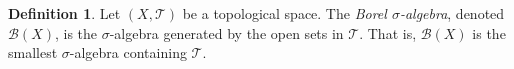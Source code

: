 \documentclass[a4paper,11pt]{article}
\theoremstyle{plain}
\newtheorem{lemma}[theorem]{Lemma}
\theoremstyle{definition}
\newtheorem{definition}[theorem]{Definition}
\begin{document}




\begin{definition}\citep[p.~5]{SC}
Let $(X,\mathcal{T})$ be a topological space. The \textit{Borel $\sigma$-algebra}, denoted $\mathcal{B}(X)$, is the $\sigma$-algebra generated by the open sets in $\mathcal{T}$. That is, $\mathcal{B}(X)$ is the smallest $\sigma$-algebra containing $\mathcal{T}$.
\end{definition}
\end{document}
